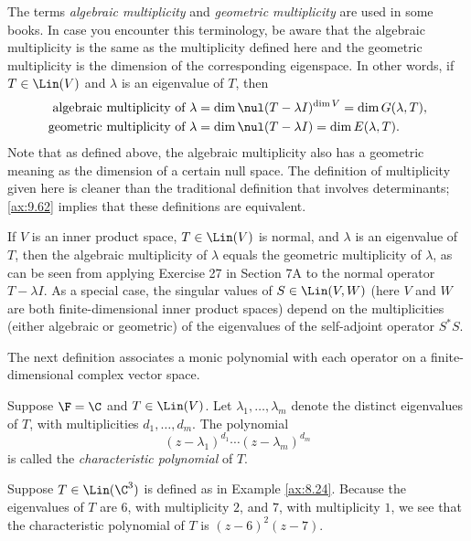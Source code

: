 The terms \emph{algebraic multiplicity} and \emph{geometric multiplicity} are
used in some books. In case you encounter this terminology, be aware that the
algebraic multiplicity is the same as the multiplicity defined here and the
geometric multiplicity is the dimension of the corresponding eigenspace. In
other words, if $T\in\Lin(V)$ and $\lambda$ is an eigenvalue of $T$, then
\begin{align*}
\text{algebraic multiplicity of } \lambda
  &= \dim\nul(T-\lambda I)^{\dim V} = \dim G(\lambda,T),\\
\text{geometric multiplicity of } \lambda
  &= \dim\nul(T-\lambda I) = \dim E(\lambda,T).
\end{align*}
Note that as defined above, the algebraic multiplicity also has a geometric
meaning as the dimension of a certain null space. The definition of
multiplicity given here is cleaner than the traditional definition that
involves determinants; \ref{ax:9.62} implies that these definitions are
equivalent.

If $V$ is an inner product space, $T\in\Lin(V)$ is normal, and $\lambda$ is an
eigenvalue of $T$, then the algebraic multiplicity of $\lambda$ equals the
geometric multiplicity of $\lambda$, as can be seen from applying Exercise 27
in Section 7A to the normal operator $T-\lambda I$. As a special case, the
singular values of $S\in\Lin(V,W)$ (here $V$ and $W$ are both
finite-dimensional inner product spaces) depend on the multiplicities (either
algebraic or geometric) of the eigenvalues of the self-adjoint operator
$S^*S$.

The next definition associates a monic polynomial with each operator on a
finite-dimensional complex vector space.

\begin{definition}\label{ax:8.26}
Suppose $\F=\C$ and $T\in\Lin(V)$. Let $\lambda_1,\dots,\lambda_m$ denote the
distinct eigenvalues of $T$, with multiplicities $d_1,\dots,d_m$. The
polynomial
\[ (z-\lambda_1)^{d_1}\cdots(z-\lambda_m)^{d_m} \]
is called the \emph{characteristic polynomial} of $T$.
\end{definition}

\begin{example}\label{ax:8.27}
Suppose $T\in\Lin(\C^3)$ is defined as in Example \ref{ax:8.24}. Because the
eigenvalues of $T$ are $6$, with multiplicity $2$, and $7$, with multiplicity
$1$, we see that the characteristic polynomial of $T$ is $(z-6)^2(z-7)$.
\end{example}

